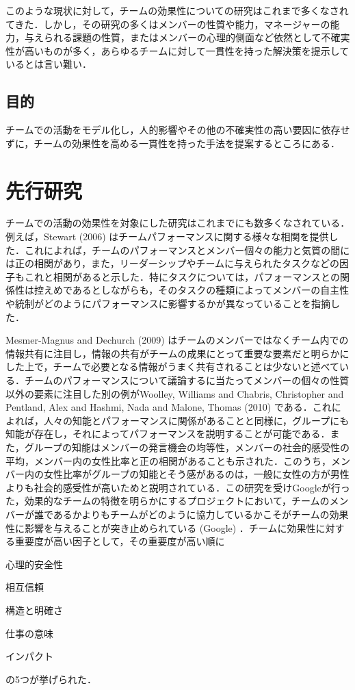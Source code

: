 \documentclass[a4paper, 11pt]{jsarticle}
\begin{document}
このような現状に対して，チームの効果性についての研究はこれまで多くなされてきた．しかし，その研究の多くはメンバーの性質や能力，マネージャーの能力，与えられる課題の性質，またはメンバーの心理的側面など依然として不確実性が高いものが多く，あらゆるチームに対して一貫性を持った解決策を提示しているとは言い難い．
\subsection{目的}
チームでの活動をモデル化し，人的影響やその他の不確実性の高い要因に依存せずに，チームの効果性を高める一貫性を持った手法を提案するところにある．

\section{先行研究}
チームでの活動の効果性を対象にした研究はこれまでにも数多くなされている．例えば，Stewart (2006) \cite{Stewart}はチームパフォーマンスに関する様々な相関を提供した．これによれば，チームのパフォーマンスとメンバー個々の能力と気質の間には正の相関があり，また，リーダーシップやチームに与えられたタスクなどの因子もこれと相関があると示した．特にタスクについては，パフォーマンスとの関係性は控えめであるとしながらも，そのタスクの種類によってメンバーの自主性や統制がどのようにパフォーマンスに影響するかが異なっていることを指摘した．

Mesmer-Magnus and Dechurch (2009) \cite{Mesmer}はチームのメンバーではなくチーム内での情報共有に注目し，情報の共有がチームの成果にとって重要な要素だと明らかにした上で，チームで必要となる情報がうまく共有されることは少ないと述べている．チームのパフォーマンスについて議論するに当たってメンバーの個々の性質以外の要素に注目した別の例がWoolley, Williams and Chabris, Christopher and Pentland, Alex and Hashmi, Nada and Malone, Thomas (2010) \cite{Woolley}である．これによれば，人々の知能とパフォーマンスに関係があることと同様に，グループにも知能が存在し，それによってパフォーマンスを説明することが可能である．また，グループの知能はメンバーの発言機会の均等性，メンバーの社会的感受性の平均，メンバー内の女性比率と正の相関があることも示された．このうち，メンバー内の女性比率がグループの知能とそう感があるのは，一般に女性の方が男性よりも社会的感受性が高いためと説明されている．この研究を受けGoogleが行った，効果的なチームの特徴を明らかにするプロジェクトにおいて，チームのメンバーが誰であるかよりもチームがどのように協力しているかこそがチームの効果性に影響を与えることが突き止められている (Google\cite{Google}) ．チームに効果性に対する重要度が高い因子として，その重要度が高い順に
\begin{inparaenum}[1)]
  \item 心理的安全性
  \item 相互信頼
  \item 構造と明確さ
  \item 仕事の意味
  \item インパクト
\end{inparaenum}
の5つが挙げられた．
\end{document}
